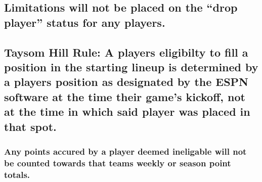 \documentclass[
]{book}
\begin{document}
\hypertarget{limitations-will-not-be-placed-on-the-drop-player-status-for-any-players.}{%
\subsection{Limitations will not be placed on the ``drop player'' status for any players.}\label{limitations-will-not-be-placed-on-the-drop-player-status-for-any-players.}}

\hypertarget{taysom-hill-rule-a-players-eligibilty-to-fill-a-position-in-the-starting-lineup-is-determined-by-a-players-position-as-designated-by-the-espn-software-at-the-time-their-games-kickoff-not-at-the-time-in-which-said-player-was-placed-in-that-spot.}{%
\subsection{Taysom Hill Rule: A players eligibilty to fill a position in the starting lineup is determined by a players position as designated by the ESPN software at the time their game's kickoff, not at the time in which said player was placed in that spot.}\label{taysom-hill-rule-a-players-eligibilty-to-fill-a-position-in-the-starting-lineup-is-determined-by-a-players-position-as-designated-by-the-espn-software-at-the-time-their-games-kickoff-not-at-the-time-in-which-said-player-was-placed-in-that-spot.}}

\hypertarget{any-points-accured-by-a-player-deemed-ineligable-will-not-be-counted-towards-that-teams-weekly-or-season-point-totals.}{%
\subsubsection{Any points accured by a player deemed ineligable will not be counted towards that teams weekly or season point totals.}\label{any-points-accured-by-a-player-deemed-ineligable-will-not-be-counted-towards-that-teams-weekly-or-season-point-totals.}}
\end{document}
